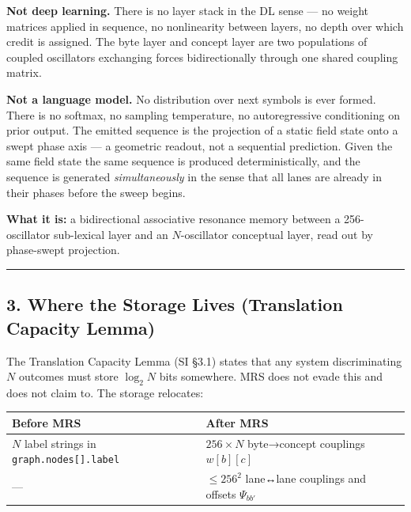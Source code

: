 \documentclass[
  11pt,
  a4paper,
]{article}
\begin{document}
\textbf{Not deep learning.} There is no layer stack in the DL sense ---
no weight matrices applied in sequence, no nonlinearity between layers,
no depth over which credit is assigned. The byte layer and concept layer
are two populations of coupled oscillators exchanging forces
bidirectionally through one shared coupling matrix.

\textbf{Not a language model.} No distribution over next symbols is ever
formed. There is no softmax, no sampling temperature, no autoregressive
conditioning on prior output. The emitted sequence is the projection of
a static field state onto a swept phase axis --- a geometric readout,
not a sequential prediction. Given the same field state the same
sequence is produced deterministically, and the sequence is generated
\emph{simultaneously} in the sense that all lanes are already in their
phases before the sweep begins.

\textbf{What it is:} a bidirectional associative resonance memory
between a 256-oscillator sub-lexical layer and an \(N\)-oscillator
conceptual layer, read out by phase-swept projection.

\begin{center}\rule{0.5\linewidth}{0.5pt}\end{center}

\subsection{3. Where the Storage Lives (Translation Capacity
Lemma)}\label{where-the-storage-lives-translation-capacity-lemma}

The Translation Capacity Lemma (SI §3.1) states that any system
discriminating \(N\) outcomes must store \(\log_2 N\) bits somewhere.
MRS does not evade this and does not claim to. The storage relocates:

\begin{longtable}[]{@{}
  >{\raggedright\arraybackslash}p{}
  >{\raggedright\arraybackslash}p{}@{}}
\toprule\noalign{}
\begin{minipage}[b]{\linewidth}\raggedright
Before MRS
\end{minipage} & \begin{minipage}[b]{\linewidth}\raggedright
After MRS
\end{minipage} \\
\midrule\noalign{}
\endhead
\bottomrule\noalign{}
\endlastfoot
\(N\) label strings in \texttt{graph.nodes{[}{]}.label} &
\(256 \times N\) byte→concept couplings \(w[b][c]\) \\
--- & \(\le 256^2\) lane↔lane couplings and offsets \(\Psi_{bb'}\) \\
\end{longtable}
\end{document}
